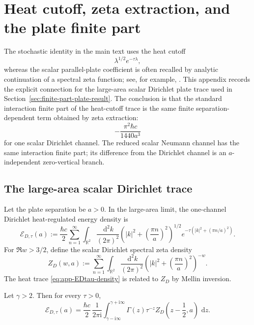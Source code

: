 \documentclass[11pt]{article}
\providecommand{\R}{\mathbb{R}}
\providecommand{\ii}{\mathrm{i}}
\providecommand{\dd}{\,\mathrm{d}}
\providecommand{\hbarc}{\hbar c}
\providecommand{\abs}[1]{\left\lvert #1\right\rvert}
\providecommand{\paren}[1]{\left(#1\right)}
\numberwithin{equation}{section}
\begin{document}
\section{Heat cutoff, zeta extraction, and the plate finite part}
\label{app:heat-zeta-finite-part}

The stochastic identity in the main text uses the heat cutoff
\[
    \lambda^{1/2}e^{-\tau\lambda},
\]
whereas the scalar parallel-plate coefficient is often recalled by analytic
continuation of a spectral zeta function; see, for example,
\cite{Bordag2009,Kirsten2001,Vassilevich2003}.  This appendix records the
explicit connection for the large-area scalar Dirichlet plate trace used in
Section~\ref{sec:finite-part-plate-result}.  The conclusion is that the
standard interaction finite part of the heat-cutoff trace is the same finite
separation-dependent term obtained by zeta extraction:
\[
    -\frac{\pi^2\hbarc}{1440a^3}
\]
for one scalar Dirichlet channel.  The reduced scalar Neumann channel has the
same interaction finite part; its difference from the Dirichlet channel is an
\(a\)-independent zero-vertical branch.

\subsection{The large-area scalar Dirichlet trace}
\label{subsec:app-large-area-dirichlet-trace}

Let the plate separation be \(a>0\).  In the large-area limit, the one-channel
Dirichlet heat-regulated energy density is
\begin{equation}
\label{eq:app-EDtau-density}
    \mathcal E_{D,\tau}(a)
    :=
    \frac{\hbarc}{2}
    \sum_{n=1}^{\infty}
    \int_{\R^2}\frac{\dd^2k}{(2\pi)^2}
    \paren{\abs{k}^2+\paren{\frac{\pi n}{a}}^2}^{1/2}
    e^{-\tau\left(\abs{k}^2+(\pi n/a)^2\right)} .
\end{equation}
For \(\Re w>3/2\), define the scalar Dirichlet spectral zeta density
\begin{equation}
\label{eq:app-ZD-def}
    Z_D(w,a)
    :=
    \sum_{n=1}^{\infty}
    \int_{\R^2}\frac{\dd^2k}{(2\pi)^2}
    \paren{\abs{k}^2+\paren{\frac{\pi n}{a}}^2}^{-w} .
\end{equation}
The heat trace \eqref{eq:app-EDtau-density} is related to \(Z_D\) by Mellin
inversion.

\begin{proposition}
\label{prop:app-mellin-heat-zeta}
Let \(\gamma>2\).  Then for every \(\tau>0\),
\begin{equation}
\label{eq:app-mellin-heat-zeta}
    \mathcal E_{D,\tau}(a)
    =
    \frac{\hbarc}{2}\,
    \frac{1}{2\pi\ii}
    \int_{\gamma-\ii\infty}^{\gamma+\ii\infty}
    \Gamma(z)\tau^{-z}Z_D\paren{z-\frac12,a}\,\dd z .
\end{equation}
\end{proposition}
\end{document}
